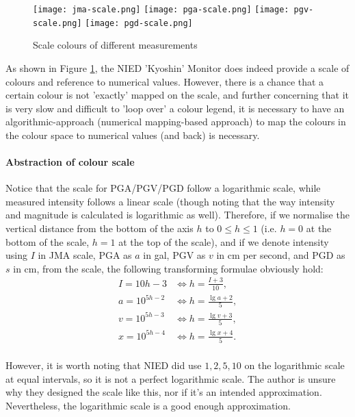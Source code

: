 \begin{figure}[htp]
    \centering
    \texttt{[image: jma-scale.png]}
    \texttt{[image: pga-scale.png]}
    \texttt{[image: pgv-scale.png]}
    \texttt{[image: pgd-scale.png]}
    \caption{Scale colours of different measurements}
    \label{fig:scale-colour}
\end{figure}

As shown in Figure \ref{fig:scale-colour}, the NIED 'Kyoshin' Monitor does indeed provide a scale of colours and reference to numerical values. However, there is a chance that a certain colour is not 'exactly' mapped on the scale, and further concerning that it is very slow and difficult to 'loop over' a colour legend, it is necessary to have an algorithmic-approach (numerical mapping-based approach) to map the colours in the colour space to numerical values (and back) is necessary.

\paragraph{Abstraction of colour scale}

Notice that the scale for PGA/PGV/PGD follow a logarithmic scale, while measured intensity follows a linear scale (though noting that the way intensity and magnitude is calculated is logarithmic as well). Therefore, if we normalise the vertical distance from the bottom of the axis \(h\) to \(0 \leq h \leq 1\) (i.e. \(h = 0\) at the bottom of the scale, \(h = 1\) at the top of the scale), and if we denote intensity using \(I\) in JMA scale, PGA as \(a\) in gal, PGV as \(v\) in cm per second, and PGD as \(s\) in cm, from the scale, the following transforming formulae obviously hold:
\begin{align*}
    I  = 10h - 3     & \iff h      = \frac{I + 3}{10}, \\
    a  = 10^{5h - 2} & \iff h  = \frac{\lg a + 2}{5},  \\
    v  = 10^{5h - 3} & \iff h  = \frac{\lg v + 3}{5},  \\
    x  = 10^{5h - 4} & \iff h  = \frac{\lg x + 4}{5}.  \\
\end{align*}

However, it is worth noting that NIED did use \(1, 2, 5, 10\) on the logarithmic scale at equal intervals, so it is not a perfect logarithmic scale. The author is unsure why they designed the scale like this, nor if it's an intended approximation. Nevertheless, the logarithmic scale is a good enough approximation.

